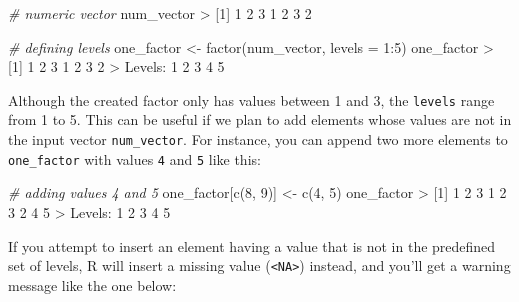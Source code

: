 \documentclass[
]{book}
\newenvironment{Shaded}{\begin{snugshade}}{\end{snugshade}}
\newcommand{\AttributeTok}[1]{\textcolor[rgb]{0.77,0.63,0.00}{#1}}
\newcommand{\CommentTok}[1]{\textcolor[rgb]{0.56,0.35,0.01}{\textit{#1}}}
\newcommand{\DecValTok}[1]{\textcolor[rgb]{0.00,0.00,0.81}{#1}}
\newcommand{\FunctionTok}[1]{\textcolor[rgb]{0.00,0.00,0.00}{#1}}
\newcommand{\NormalTok}[1]{#1}
\newcommand{\OtherTok}[1]{\textcolor[rgb]{0.56,0.35,0.01}{#1}}
\newcommand{\SpecialCharTok}[1]{\textcolor[rgb]{0.00,0.00,0.00}{#1}}
\begin{document}
\begin{Shaded}
\begin{Highlighting}[]
\CommentTok{\# numeric vector}
\NormalTok{num\_vector}
\SpecialCharTok{\textgreater{}}\NormalTok{ [}\DecValTok{1}\NormalTok{] }\DecValTok{1} \DecValTok{2} \DecValTok{3} \DecValTok{1} \DecValTok{2} \DecValTok{3} \DecValTok{2}

\CommentTok{\# defining levels}
\NormalTok{one\_factor }\OtherTok{\textless{}{-}} \FunctionTok{factor}\NormalTok{(num\_vector, }\AttributeTok{levels =} \DecValTok{1}\SpecialCharTok{:}\DecValTok{5}\NormalTok{)}
\NormalTok{one\_factor}
\SpecialCharTok{\textgreater{}}\NormalTok{ [}\DecValTok{1}\NormalTok{] }\DecValTok{1} \DecValTok{2} \DecValTok{3} \DecValTok{1} \DecValTok{2} \DecValTok{3} \DecValTok{2}
\SpecialCharTok{\textgreater{}}\NormalTok{ Levels}\SpecialCharTok{:} \DecValTok{1} \DecValTok{2} \DecValTok{3} \DecValTok{4} \DecValTok{5}
\end{Highlighting}
\end{Shaded}

Although the created factor only has values between 1 and 3, the \texttt{levels} range
from 1 to 5. This can be useful if we plan to add elements whose values are not
in the input vector \texttt{num\_vector}. For instance, you can append two more elements
to \texttt{one\_factor} with values \texttt{4} and \texttt{5} like this:

\begin{Shaded}
\begin{Highlighting}[]
\CommentTok{\# adding values 4 and 5}
\NormalTok{one\_factor[}\FunctionTok{c}\NormalTok{(}\DecValTok{8}\NormalTok{, }\DecValTok{9}\NormalTok{)] }\OtherTok{\textless{}{-}} \FunctionTok{c}\NormalTok{(}\DecValTok{4}\NormalTok{, }\DecValTok{5}\NormalTok{)}
\NormalTok{one\_factor}
\SpecialCharTok{\textgreater{}}\NormalTok{ [}\DecValTok{1}\NormalTok{] }\DecValTok{1} \DecValTok{2} \DecValTok{3} \DecValTok{1} \DecValTok{2} \DecValTok{3} \DecValTok{2} \DecValTok{4} \DecValTok{5}
\SpecialCharTok{\textgreater{}}\NormalTok{ Levels}\SpecialCharTok{:} \DecValTok{1} \DecValTok{2} \DecValTok{3} \DecValTok{4} \DecValTok{5}
\end{Highlighting}
\end{Shaded}

If you attempt to insert an element having a value that is not in the
predefined set of levels, R will insert a missing value (\texttt{\textless{}NA\textgreater{}}) instead, and
you'll get a warning message like the one below:
\end{document}
